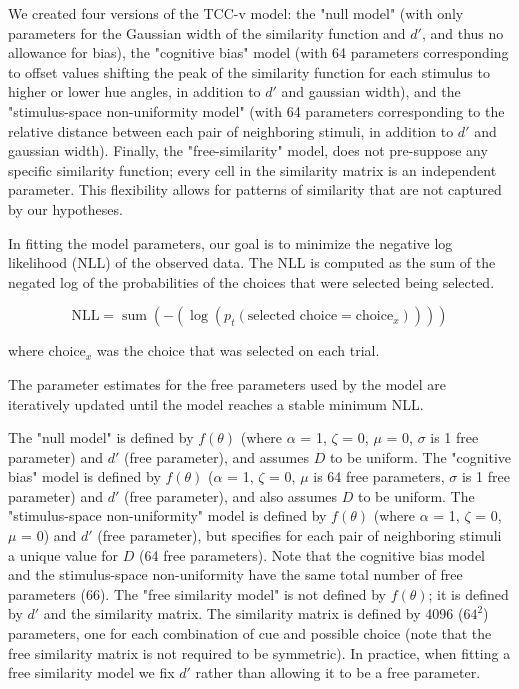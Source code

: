 \documentclass[9pt,biorxiv,lineno,onehalfspacing]{lapreprint}
\begin{document}
\begin{refsection}
We created four versions of the TCC-v model: the "null model" (with only parameters for the Gaussian width of the similarity function and $d'$, and thus no allowance for bias), the "cognitive bias" model (with 64 parameters corresponding to offset values shifting the peak of the similarity function for each stimulus to higher or lower hue angles, in addition to $d'$ and gaussian width), and the "stimulus-space non-uniformity model" (with 64 parameters corresponding to the relative distance between each pair of neighboring stimuli, in addition to $d'$ and gaussian width). 
Finally, the "free-similarity" model, does not pre-suppose any specific similarity function; every cell in the similarity matrix is an independent parameter. 
This flexibility allows for patterns of similarity that are not captured by our hypotheses. 

In fitting the model parameters, our goal is to minimize the negative log likelihood (NLL) of the observed data. 
The NLL is computed as the sum of the negated log of the probabilities of the choices that were selected being selected. 

\begin{equation}
    \text{NLL} = \operatorname{sum}\left(-\left(\log \left(p_t\left(\text {selected choice} = \text{choice}_x\right)\right)\right)\right)
\end{equation}

where $\text{choice}_x$ was the choice that was selected on each trial.

The parameter estimates for the free parameters used by the model are iteratively updated until the model reaches a stable minimum NLL. 

The "null model" is defined by $f(\theta)$ (where $\alpha$ = 1, $\zeta$ = 0, $\mu$ = 0, $\sigma$ is 1 free parameter) and $d'$ (free parameter), and assumes $D$ to be uniform. 
The "cognitive bias" model is defined by $f(\theta)$ ($\alpha$ = 1, $\zeta$ = 0, $\mu$ is 64 free parameters, $\sigma$ is 1 free parameter) and $d'$ (free parameter), and also assumes $D$ to be uniform. 
The "stimulus-space non-uniformity" model is defined by $f(\theta)$ (where $\alpha$ = 1, $\zeta$ = 0, $\mu$ = 0) and $d'$ (free parameter), but specifies for each pair of neighboring stimuli a unique value for $D$ (64 free parameters). 
Note that the cognitive bias model and the stimulus-space non-uniformity have the same total number of free parameters (66). 
The "free similarity model" is not defined by $f(\theta)$; it is defined by $d'$ and the similarity matrix. 
The similarity matrix is defined by 4096 ($64^2$) parameters, one for each combination of cue and possible choice (note that the free similarity matrix is not required to be symmetric).
In practice, when fitting a free similarity model we fix $d'$ rather than allowing it to be a free parameter.


\end{refsection}
\end{document}
